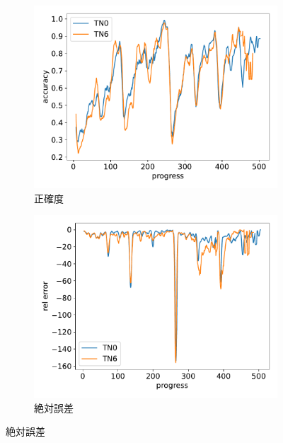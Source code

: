 \begin{figure}[t]
\centering
\begin{subfigure}[b]{0.49\linewidth}
    \includegraphics[width=\linewidth]{pdf/compare/merged_EXP_5_NT8_OI1200_compare/accuracy.pdf}
    \caption{正確度}
    \label{fig:nt8_exp5_accuracy}
\end{subfigure}
\begin{subfigure}[b]{0.49\linewidth}
    \includegraphics[width=\linewidth]{pdf/compare/merged_EXP_5_NT8_OI1200_compare/error_abs.pdf}
    \caption{絶対誤差}
    \label{fig:nt8_exp5_error_abs}
\end{subfigure}

\end{figure}
